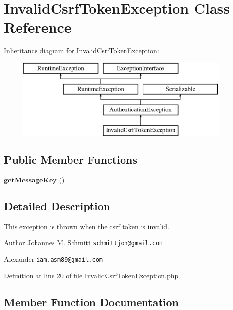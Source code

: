 \section{Invalid\+Csrf\+Token\+Exception Class Reference}
\label{class_symfony_1_1_component_1_1_security_1_1_core_1_1_exception_1_1_invalid_csrf_token_exception}
Inheritance diagram for Invalid\+Csrf\+Token\+Exception\+:\begin{figure}[H]
\begin{center}
\leavevmode
\includegraphics[height=4.000000cm]{class_symfony_1_1_component_1_1_security_1_1_core_1_1_exception_1_1_invalid_csrf_token_exception}
\end{center}
\end{figure}
\subsection*{Public Member Functions}
\begin{DoxyCompactItemize}
\item 
{\bf get\+Message\+Key} ()
\end{DoxyCompactItemize}


\subsection{Detailed Description}
This exception is thrown when the csrf token is invalid.

\begin{DoxyAuthor}{Author}
Johannes M. Schmitt {\tt schmittjoh@gmail.\+com} 

Alexander {\tt iam.\+asm89@gmail.\+com} 
\end{DoxyAuthor}


Definition at line 20 of file Invalid\+Csrf\+Token\+Exception.\+php.



\subsection{Member Function Documentation}
